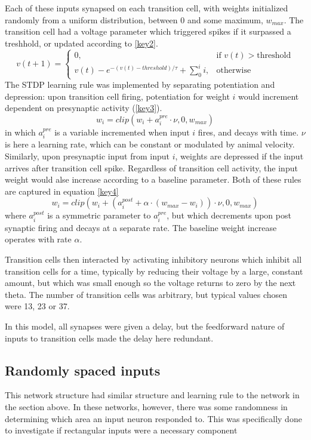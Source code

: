 \documentclass{article}
\begin{document}
    Each of these inputs synapsed on each transition cell, with weights initialized randomly from a uniform distribution, between 0 and some maximum, \(w_{max}\). The transition cell had a voltage parameter which triggered spikes if it surpassed a treshhold, or updated according to \ref{key2}. \begin{equation} \label{key2} v(t+1) =  \begin{cases} 0, & \text{if } v(t) > \text{threshold}\\ v(t) - e^{-(v(t) - threshold) / \tau} + \sum_{0}^{i} i, & \text{otherwise} \end{cases} \end{equation}
    The STDP learning rule was implemented by separating potentiation and depression: upon transition cell firing, potentiation for weight \(i\) would increment dependent on presynaptic activity (\ref{key3}).  \begin{equation} \label{key3} w_i = clip(w_i + a^{pre}_i \cdot \nu, 0, w_{max})\end{equation} in which \(a^{pre}_i\) is a variable incremented when input \(i\) fires, and decays with time. \(\nu\) is here a learning rate, which can be constant or modulated by animal velocity. 
    Similarly, upon presynaptic input from input \(i\), weights are depressed if the input arrives after transition cell spike. Regardless of transition cell activity, the input weight would alse increase according to a baseline parameter. Both of these rules are captured in equation \ref{key4} \begin{equation} \label{key4} w_i = clip(w_i + (a^{post}_i + \alpha \cdot (w_{max}-w_i)) \cdot \nu, 0, w_{max})\end{equation} where \(a^{post}_i\) is a symmetric parameter to \(a^{pre}_i\), but which decrements upon post synaptic firing and decays at a separate rate. The baseline weight increase operates with rate \(\alpha\).

    Transition cells then interacted by activating inhibitory neurons which inhibit all transition cells for a time, typically by reducing their voltage by a large, constant amount, but which was small enough so the voltage returns to zero by the next theta. The number of transition cells was arbitrary, but typical values chosen were 13, 23 or 37.

    In this model, all synapses were given a delay, but the feedforward nature of inputs to transition cells made the delay here redundant.

    \subsection{Randomly spaced inputs}
    This network structure had similar structure and learning rule to the network in the section above. In these networks, however, there was some randomness in determining which area an input neuron responded to. This was specifically done to investigate if rectangular inputs were a necessary component
    
\end{document}

